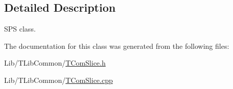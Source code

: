 \subsection{Detailed Description}
S\+PS class. 

The documentation for this class was generated from the following files\+:\begin{DoxyCompactItemize}
\item 
Lib/\+T\+Lib\+Common/\hyperlink{_t_com_slice_8h}{T\+Com\+Slice.\+h}\item 
Lib/\+T\+Lib\+Common/\hyperlink{_t_com_slice_8cpp}{T\+Com\+Slice.\+cpp}\end{DoxyCompactItemize}
